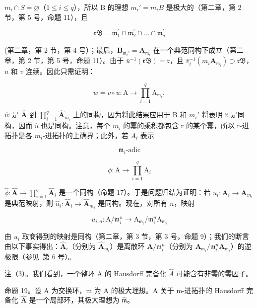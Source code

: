 \(m_{i} \cap S = \varnothing\)（\(1 \leqslant i \leqslant q\)），所以 B 的理想 \(m_{i}' = m_{i}B\) 是极大的（第二章，第 2 节，第 5 号，命题 11），且

\[
\mathfrak {r B} = \mathfrak {m} _ {1} ^ {\prime} \cap \mathfrak {m} _ {2} ^ {\prime} \cap \dots \cap \mathfrak {m} _ {q} ^ {\prime}
\]

(第二章，第 2 节，第 4 号）；最后，\(\mathbf{B}_{\mathfrak{m}_i'} = \mathbf{A}_{\mathfrak{m}_i}\) 在一个典范同构下成立（第二章，第 2 节，第 5 号，命题 11）。由于 \(\bar{u}^{-1}(\mathfrak{rB}) = \mathfrak{r}\)，且 \(\bar{v}_i^{-1}(m_i\mathbf{A}_{\mathfrak{m}_i}) \supset \mathfrak{rB}\)，\(u\) 和 \(v\) 连续。因此只需证明：

\[
w = v \circ u: \mathrm{A} \rightarrow \prod_ {i = 1} ^ {q} \mathrm{A} _ {\mathfrak {m} _ {i}},
\]

\(\hat{w}\) 是 \(\hat{\mathbf{A}}\) 到 \(\prod_{i=1}^{q} \hat{\mathbf{A}}_{m_i}\) 上的同构，因为将此结果应用于 B 和 \(m_i'\) 将表明 \(\hat{v}\) 是同构，因而 \(\hat{u}\) 也是同构。注意，每个 \(m_i\) 的幂的乘积都包含 r 的某个幂，所以 r-进拓扑是各 \(m_i\)-进拓扑的上确界；此外，若 \(A_i\) 表示

\[
\mathfrak {m} _ {i} \text {-adic}
\]

\[
\phi : \mathrm{A} \rightarrow \prod_ {i = 1} ^ {q} \mathrm{A} _ {i}
\]

\(\hat{\phi}:\hat{\mathbf{A}}\to \prod_{i = 1}^{q}\hat{\mathbf{A}}_i\) 是一个同构（命题 17）。于是问题归结为证明：若 \(u_{i}:\mathbf{A}_{i}\rightarrow \mathbf{A}_{m_{i}}\) 是典范映射，则 \(\hat{u}_i\colon \hat{\mathbf{A}}_i\to \hat{\mathbf{A}}_{m_i}\) 是同构。现在，对所有 \(n\)，映射

\[
u _ {i, n} \colon \mathrm{A} / \mathfrak {m} _ {i} ^ {n} \rightarrow \mathrm{A} _ {\mathfrak {m} _ {i}} / \mathfrak {m} _ {i} ^ {n} \mathrm{A} _ {\mathfrak {m} _ {i}}
\]

由 \(u_{i}\) 取商得到的映射是同构（第二章，第 3 节，第 3 号，命题 9）；我们的断言由以下事实得出：\(\hat{\mathbf{A}}_i\)（分别为 \(\hat{\mathbf{A}}_{\mathfrak{m}_i}\)）是离散环 \(\mathbf{A} / \mathfrak{m}_i^n\)（分别为 \(\mathbf{A}_{\mathfrak{m}_i} / \mathfrak{m}_i^n \mathbf{A}_{\mathfrak{m}_i}\)）的逆极限（参见~第 6 号）。

注（3）。我们看到，一个整环 A 的 Hausdorff 完备化 \(\hat{A}\) 可能含有非零的零因子。

命题 19。设 A 为交换环，m 为 A 的极大理想。A 关于 m-进拓扑的 Hausdorff 完备化 \(\hat{\mathbf{A}}\) 是一个局部环，其极大理想为 \(\hat{\mathfrak{m}}\)。

